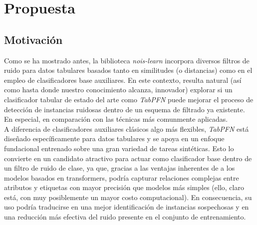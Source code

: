 \documentclass[print, color]{ugrTFG}
\begin{document}
\chapter{Propuesta}\label{sect:propuesta}
\section{Motivación}
Como se ha mostrado antes, la biblioteca \textit{nois-learn} incorpora diversos filtros de ruido para datos tabulares basados tanto en similitudes (o distancias) como en el empleo de clasificadores base auxiliares. En este contexto, resulta natural (así como hasta donde nuestro conocimiento alcanza, innovador) explorar si un clasificador tabular de estado del arte como \textit{TabPFN}\cite{hollmann2023tabpfntransformersolvessmall} puede mejorar el proceso de detección de instancias ruidosas dentro de un esquema de filtrado ya existente. En especial, en comparación con las técnicas más comunmente aplicadas.\\

A diferencia de clasificadores auxiliares clásicos algo más flexibles, \textit{TabPFN} está diseñado específicamente para datos tabulares y se apoya en un enfoque fundacional entrenado sobre una gran variedad de tareas sintéticas. Esto lo convierte en un candidato atractivo para actuar como clasificador base dentro de un filtro de ruido de clase, ya que, gracias a las ventajas inherentes de a los modelos basados en transformers, podría capturar relaciones complejas entre atributos y etiquetas con mayor precisión que modelos más simples (ello, claro está, con muy posiblemente un mayor costo computacional). En consecuencia, su uso podría traducirse en una mejor identificación de instancias sospechosas y en una reducción más efectiva del ruido presente en el conjunto de entrenamiento.
\end{document}
